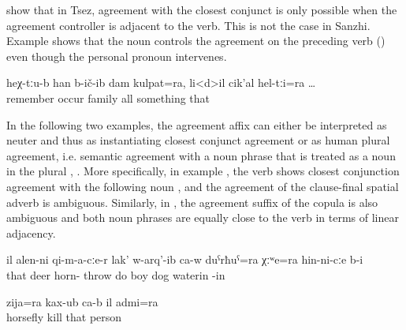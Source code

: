 \citet{Polinsky.etal2009} show that in Tsez, agreement with the closest conjunct is only possible when the agreement controller is adjacent to the verb. This is not the case in Sanzhi. Example  shows that the noun   controls the agreement on the preceding verb () even though the personal pronoun intervenes.
%
\begin{exe}
	\ex	\label{ex:‎‎And there I remembered my family and everything}
	\gll	heχ-tːu-b	han	b-ič-ib	dam	kulpat=ra,	li<d>il	cik'al	hel-tːi=ra \ldots\\
			remember	occur		family	all	something	that\\
	\glt	{}
\end{exe}

In the following two examples, the agreement affix  can either be interpreted as neuter and thus as instantiating closest conjunct agreement or as human plural agreement, i.e. semantic agreement with a noun phrase that is treated as a noun in the plural , . More specifically, in example , the verb shows closest conjunction agreement with the following noun  , and the agreement of the clause-final spatial adverb   is ambiguous. Similarly, in , the agreement suffix of the copula  is also ambiguous and both noun phrases are equally close to the verb in terms of linear adjacency.
%
\begin{exe}
	\ex	\label{ex:‎The deer on its horns threw the boy and the dog into the water}
	\gll	il	alen-ni	qi-m-a-cːe-r	lak'	w-arq'-ib	ca-w	duˁrħuˁ=ra	χːʷe=ra	hin-ni-cːe	b-i\\
		that	deer	horn-	throw	do		boy\tsc{=add}	dog	waterin	-in\\
	\glt	{}

	\ex	\label{ex:‎The other shot at the forehead and killed the horsefly and the man}
	\gll	zija=ra	kax-ub	ca-b	il	admi=ra\\
		horsefly	kill		that	person\\
	\glt	{}
\end{exe}


